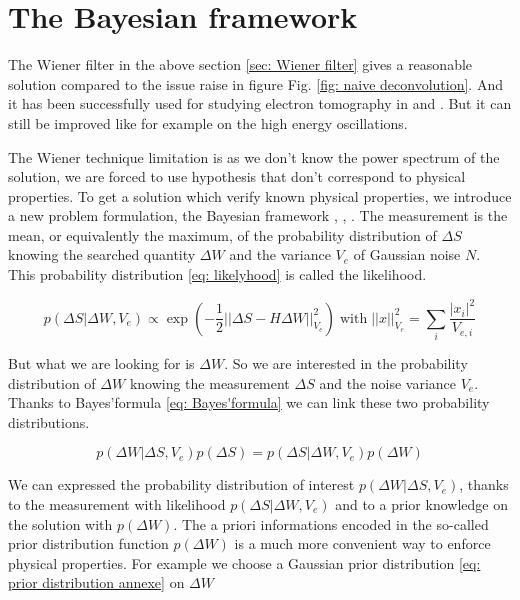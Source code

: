 \section{\texorpdfstring{The Bayesian framework}{The Bayesian framework}}

The Wiener filter in the above section \ref{sec: Wiener filter} gives a reasonable solution compared to the issue raise in figure Fig. \ref{fig: naive deconvolution}. And it has been successfully used for studying electron tomography in \cite{marguerite2017extracting} and \cite{marguerite2017two}. But it can still be improved like for example on the high energy oscillations.

The Wiener technique limitation is as we don't know the power spectrum of the solution, we are forced to use hypothesis that don't correspond to physical properties. To get a solution which verify known physical properties, we introduce a new problem formulation, the Bayesian framework \cite{ayasso2010joint}, \cite{mohammad2015bayesian}, \cite{zhao2016joint}.  The measurement is the mean, or equivalently the maximum, of the probability distribution of $\Delta S$ knowing the searched quantity $\Delta W$ and the variance $V_{e}$ of Gaussian noise $N$. This probability distribution \eqref{eq: likelyhood} is called the likelihood. 

\begin{equation}
	p\left(\Delta S | \Delta W, V_{e} \right) \propto \exp\left(-\frac{1}{2}||\Delta S - H\Delta W||_{V_{e}}^{2}\right)\;\mathrm{with}\;||x||_{V_{e}}^{2} = \sum_{i}^{}\frac{|x_{i}|^{2}}{V_{e,i}} \label{eq: likelyhood}
\end{equation}

But what we are looking for is $\Delta W$. So we are interested in the probability distribution of $\Delta W$ knowing the measurement $\Delta S$ and the noise variance $V_{e}$. Thanks to Bayes'formula \eqref{eq: Bayes'formula} we can link these two probability distributions.

\begin{equation}
	p\left(\Delta W |\Delta S , V_{e} \right)p\left(\Delta S\right) = p\left(\Delta S | \Delta W, V_{e} \right)p\left(\Delta W \right) \label{eq: Bayes'formula}
\end{equation}

We can expressed the probability distribution of interest $p\left(\Delta W |\Delta S , V_{e} \right)$, thanks to the measurement with likelihood $p\left(\Delta S | \Delta W, V_{e} \right)$ and to a prior knowledge on the solution with $p\left(\Delta W \right)$. The a priori informations encoded in the so-called prior distribution function $p\left(\Delta W \right)$ is a much more convenient way to enforce physical properties. For example we choose a Gaussian prior
distribution \eqref{eq: prior distribution annexe} on $\Delta W$

